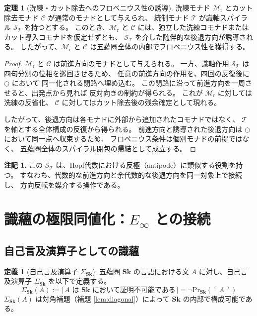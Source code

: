 \documentclass[11pt,a4paper]{article}
\theoremstyle{definition}
\newtheorem{definition}{定義}[section]
\newtheorem{theorem}{定理}[section]
\newtheorem{remark}{注記}[section]
\newcommand{\Sk}{\mathbf{Sk}}
\newcommand{\Mr}{\mathcal{M}_{\mathrm{r}}}
\newcommand{\Mc}{\mathcal{C}}
\newcommand{\T}{\mathcal{T}}
\newcommand{\SpiralT}{\mathcal{S}_{\mathcal{T}}}
\newcommand{\PrSk}{\mathrm{Pr}_{\Sk}}
\newcommand{\SigmaSk}{\Sigma_{\Sk}}
\begin{document}
\begin{theorem}[洗練・カット除去へのフロベニウス性の誘導]
洗練モナド $\Mr$ とカット除去モナド $\Mc$ が通常のモナドとして与えられ、
統制モナド $\T$ が識軸スパイラル $\SpiralT$ を持つとする。
このとき、$\Mr$ と $\Mc$ には、独立した洗練コモナドまたは
カット導入コモナドを仮定せずとも、
$\SpiralT$ を介した随伴的な後退方向が誘導される。
したがって、$\Mr$ と $\Mc$ は五蘊圏全体の内部でフロベニウス性を獲得する。
\end{theorem}
\begin{proof}
$\Mr$ と $\Mc$ は前進方向のモナドとして与えられる。
一方、識軸作用 $\SpiralT$ は四句分別の位相を巡回させるため、
任意の前進方向の作用を、四回の反復後に $\bigcirc$ において
同一化される閉路へ埋め込む。
この閉路に沿って前進方向を一周させると、出発点から見れば
反対向きの制約が得られる。
これが $\Mr$ に対しては洗練の反省化、
$\Mc$ に対してはカット除去後の残余確定として現れる。

したがって、後退方向は各モナドに外部から追加されたコモナドではなく、
$\T$ を軸とする全体構成の反復から得られる。
前進方向と誘導された後退方向は $\bigcirc$ において同一点へ収束するため、
フロベニウス条件は個別モナドの前提ではなく、
五蘊圏全体のスパイラル閉包の帰結として成立する。
\end{proof}

\begin{remark}
この $\SpiralT$ は、Hopf代数における反極（antipode）に類似する役割を持つ。
すなわち、代数的な前進方向と余代数的な後退方向を同一対象上で接続し、
方向反転を媒介する操作である。
\end{remark}

\section{識蘊の極限同値化：$E_{\infty}$ との接続}

\subsection{自己言及演算子としての識蘊}

\begin{definition}[自己言及演算子 $\SigmaSk$]\label{def:self-reference-op}
五蘊圏 $\Sk$ の言語における文 $A$ に対し、自己言及演算子 $\SigmaSk$ を以下で定義する。
\begin{equation}
\SigmaSk(A) := \lceil A \text{ は } \Sk \text{ において証明不可能である} \rceil 
= \neg\PrSk(\ulcorner A \urcorner)
\end{equation}
$\SigmaSk(A)$ は対角補題（補題 \ref{lem:diagonal}）によって $\Sk$ の内部で構成可能である。
\end{definition}
\end{document}
